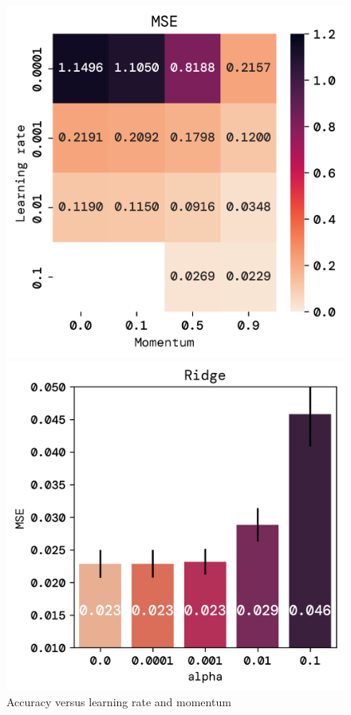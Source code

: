 \documentclass[twoside,11pt]{report}
\begin{document}
    \begin{figure}[!ht]
        \begin{minipage}[t]{0.5\textwidth - 1mm}
            \begin{center}
                \includegraphics[width=\textwidth]{../runsAndFigures/MSE_lr_gamma.png}
            \end{center}
            \caption{Accuracy versus learning rate and momentum
            }\label{fig:MSE_lr_gamma}
        \end{minipage}
        \hspace{2mm}
        \begin{minipage}[t]{0.5\textwidth - 1mm}
            \begin{center}
                \includegraphics[width=\textwidth]{../runsAndFigures/MSE_alpha.png}

\end{center}
\end{minipage}
\end{figure}
\end{document}
